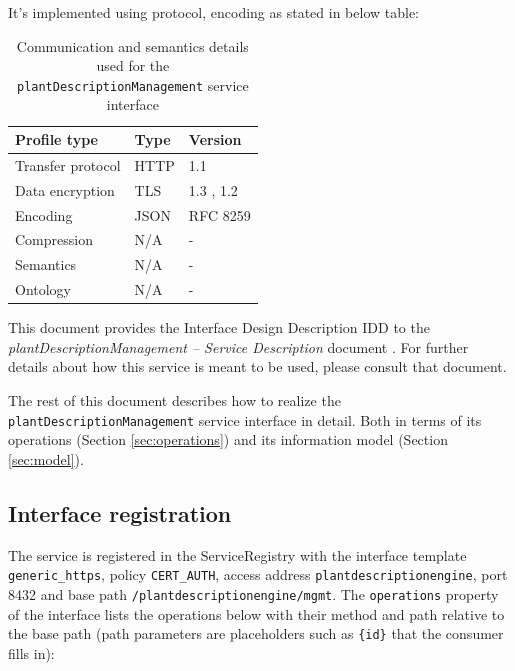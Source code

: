 \documentclass[a4paper]{arrowhead}
\begin{document}
It's implemented using protocol, encoding as stated in below table:
\begin{table}[ht!]
  \centering
  \begin{tabular}{|l|l|l|}
    \hline
    \rowcolor{gray!33} Profile type & Type & Version \\ \hline
    Transfer protocol & HTTP & 1.1 \cite{rfc9112} \\ \hline
    Data encryption & TLS & 1.3 \cite{rfc8446}, 1.2 \cite{rfc5246} \\ \hline
    Encoding & JSON & RFC 8259 \cite{rfc8259} \\ \hline
    Compression & N/A & - \\ \hline
    Semantics & N/A & - \\ \hline
    Ontology & N/A & - \\ \hline
  \end{tabular}
  \caption{Communication and semantics details used for the \texttt{plant\allowbreak{}Description\allowbreak{}Management} service interface}
  \label{tab:comunication_semantics_profile}
\end{table}

This document provides the Interface Design Description IDD to the \textit{plantDescriptionManagement -- Service Description} document \cite{pde-plantDescriptionManagement-sd}.
For further details about how this service is meant to be used, please consult that document.

The rest of this document describes how to realize the \texttt{plant\allowbreak{}Description\allowbreak{}Management} service
interface in detail. Both in terms of its operations (Section \ref{sec:operations}) and its information model (Section \ref{sec:model}).

\subsection{Interface registration}

The service is registered in the ServiceRegistry with the interface template \texttt{generic\_\allowbreak{}https}, policy \texttt{CERT\_\allowbreak{}AUTH}, access address \texttt{plantdescriptionengine}, port 8432 and base path \texttt{/\allowbreak{}plantdescriptionengine/\allowbreak{}mgmt}. The \texttt{operations} property of the interface lists the operations below with their method and path relative to the base path (path parameters are placeholders such as \texttt{\{id\}} that the consumer fills in):
\end{document}
